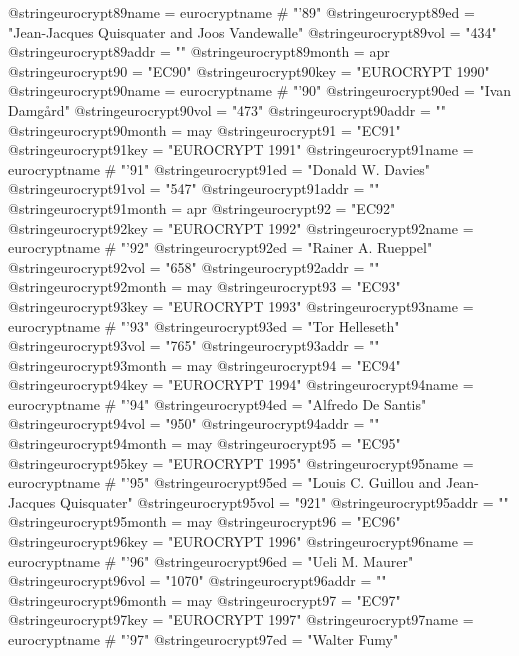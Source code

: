 @string{eurocrypt89name =       eurocryptname # "'89"}
@string{eurocrypt89ed =         "Jean-Jacques Quisquater and Joos Vandewalle"}
@string{eurocrypt89vol =        "434"}
@string{eurocrypt89addr =       ""}
@string{eurocrypt89month =      apr}
@string{eurocrypt90 =           "EC90"}
@string{eurocrypt90key =        "EUROCRYPT 1990"}
@string{eurocrypt90name =       eurocryptname # "'90"}
@string{eurocrypt90ed =         "Ivan Damg{\aa}rd"}
@string{eurocrypt90vol =        "473"}
@string{eurocrypt90addr =       ""}
@string{eurocrypt90month =      may}
@string{eurocrypt91 =           "EC91"}
@string{eurocrypt91key =        "EUROCRYPT 1991"}
@string{eurocrypt91name =       eurocryptname # "'91"}
@string{eurocrypt91ed =         "Donald W. Davies"}
@string{eurocrypt91vol =        "547"}
@string{eurocrypt91addr =       ""}
@string{eurocrypt91month =      apr}
@string{eurocrypt92 =           "EC92"}
@string{eurocrypt92key =        "EUROCRYPT 1992"}
@string{eurocrypt92name =       eurocryptname # "'92"}
@string{eurocrypt92ed =         "Rainer A. Rueppel"}
@string{eurocrypt92vol =        "658"}
@string{eurocrypt92addr =       ""}
@string{eurocrypt92month =      may}
@string{eurocrypt93 =           "EC93"}
@string{eurocrypt93key =        "EUROCRYPT 1993"}
@string{eurocrypt93name =       eurocryptname # "'93"}
@string{eurocrypt93ed =         "Tor Helleseth"}
@string{eurocrypt93vol =        "765"}
@string{eurocrypt93addr =       ""}
@string{eurocrypt93month =      may}
@string{eurocrypt94 =           "EC94"}
@string{eurocrypt94key =        "EUROCRYPT 1994"}
@string{eurocrypt94name =       eurocryptname # "'94"}
@string{eurocrypt94ed =         "Alfredo De Santis"}
@string{eurocrypt94vol =        "950"}
@string{eurocrypt94addr =       ""}
@string{eurocrypt94month =      may}
@string{eurocrypt95 =           "EC95"}
@string{eurocrypt95key =        "EUROCRYPT 1995"}
@string{eurocrypt95name =       eurocryptname # "'95"}
@string{eurocrypt95ed =         "Louis C. Guillou and Jean-Jacques Quisquater"}
@string{eurocrypt95vol =        "921"}
@string{eurocrypt95addr =       ""}
@string{eurocrypt95month =      may}
@string{eurocrypt96 =           "EC96"}
@string{eurocrypt96key =        "EUROCRYPT 1996"}
@string{eurocrypt96name =       eurocryptname # "'96"}
@string{eurocrypt96ed =         "Ueli M. Maurer"}
@string{eurocrypt96vol =        "1070"}
@string{eurocrypt96addr =       ""}
@string{eurocrypt96month =      may}
@string{eurocrypt97 =           "EC97"}
@string{eurocrypt97key =        "EUROCRYPT 1997"}
@string{eurocrypt97name =       eurocryptname # "'97"}
@string{eurocrypt97ed =         "Walter Fumy"}
